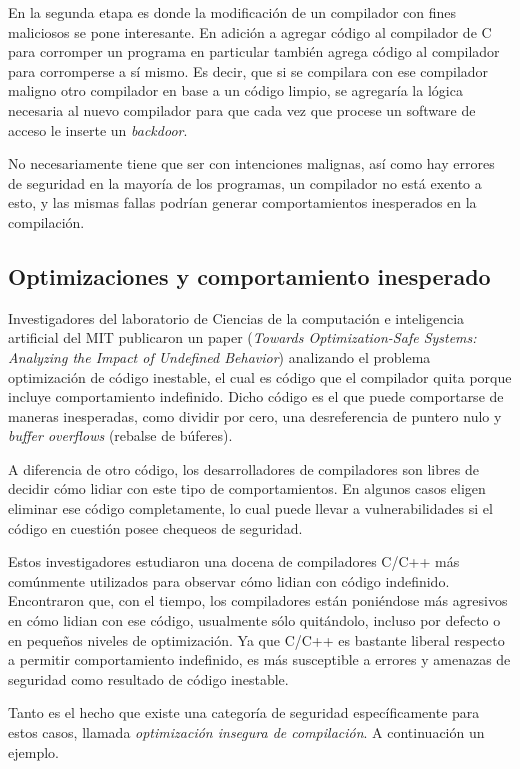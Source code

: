 En la segunda etapa es donde la modificación de un compilador con fines maliciosos se pone interesante. En adición a agregar código al compilador de C para corromper un programa en particular también agrega código al compilador para corromperse a sí mismo. Es decir, que si se compilara con ese compilador maligno otro compilador en base a un código limpio, se agregaría la lógica necesaria al nuevo compilador para que cada vez que procese un software de acceso le inserte un \textit{backdoor}.

No necesariamente tiene que ser con intenciones malignas, así como hay errores de seguridad en la mayoría de los programas, un compilador no está exento a esto, y las mismas fallas podrían generar comportamientos inesperados en la compilación.


\subsection{Optimizaciones y comportamiento inesperado}
Investigadores del laboratorio de Ciencias de la computación e inteligencia artificial del MIT publicaron un paper (\textit{Towards Optimization-Safe Systems: Analyzing the Impact of Undefined Behavior}) analizando el problema optimización de código inestable, el cual es código que el compilador quita porque incluye comportamiento indefinido. Dicho código es el que puede comportarse de maneras inesperadas, como dividir por cero, una desreferencia de puntero nulo y \textit{buffer overflows} (rebalse de búferes).

A diferencia de otro código, los desarrolladores de compiladores son libres de decidir cómo lidiar con este tipo de comportamientos. En algunos casos eligen eliminar ese código completamente, lo cual puede llevar a vulnerabilidades si el código en cuestión posee chequeos de seguridad.

Estos investigadores estudiaron una docena de compiladores C/C++ más comúnmente utilizados para observar cómo lidian con código indefinido. Encontraron que, con el tiempo, los compiladores están poniéndose más agresivos en cómo lidian con ese código, usualmente sólo quitándolo, incluso por defecto o en pequeños niveles de optimización. Ya que C/C++ es bastante liberal respecto a permitir comportamiento indefinido, es más susceptible a errores y amenazas de seguridad como resultado de código inestable.

Tanto es el hecho que existe una categoría de seguridad específicamente para estos casos, llamada \textit{optimización insegura de compilación}. A continuación un ejemplo.\cite{insecureoptOWASP}

